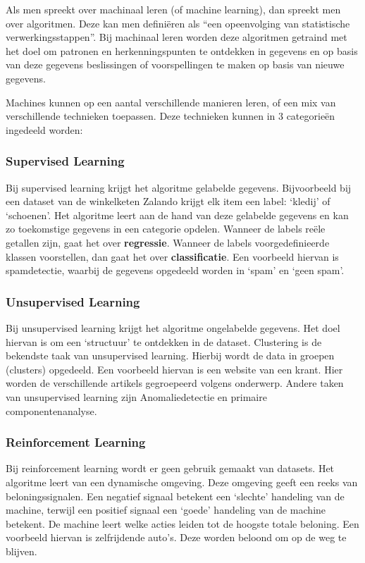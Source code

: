 Als men spreekt over machinaal leren (of machine learning), dan spreekt men over algoritmen. Deze kan men definiëren als “een opeenvolging van statistische verwerkingsstappen”. Bij machinaal leren worden deze algoritmen getraind met het doel om patronen en herkenningspunten te ontdekken in gegevens en op basis van deze gegevens beslissingen of voorspellingen te maken op basis van nieuwe gegevens. \autocite{IBM2020a}

Machines kunnen op een aantal verschillende manieren leren, of een mix van verschillende technieken toepassen. Deze technieken kunnen in 3 categorieën ingedeeld worden:

\subsubsection{Supervised Learning}
\label{sec:supervisedlearning}
Bij supervised learning krijgt het algoritme gelabelde gegevens. Bijvoorbeeld bij een dataset van de winkelketen Zalando krijgt elk item een label: ‘kledij’ of ‘schoenen’. Het algoritme leert aan de hand van deze gelabelde gegevens en kan zo toekomstige gegevens in een categorie opdelen. Wanneer de labels reële getallen zijn, gaat het over \textbf{regressie}. Wanneer de labels voorgedefinieerde klassen voorstellen, dan gaat het over \textbf{classificatie}. Een voorbeeld hiervan is spamdetectie, waarbij de gegevens opgedeeld worden in ‘spam’ en ‘geen spam’.\autocite{Lievens2020} 

\subsubsection{Unsupervised Learning}
\label{sec:unsupervisedlearning}
Bij unsupervised learning krijgt het algoritme ongelabelde gegevens. Het doel hiervan is om een ‘structuur’ te ontdekken in de dataset. Clustering is de bekendste taak van unsupervised learning. Hierbij wordt de data in groepen (clusters) opgedeeld. Een voorbeeld hiervan is een website van een krant. Hier worden de verschillende artikels gegroepeerd volgens onderwerp. \autocite{Lievens2020}
Andere taken van unsupervised learning zijn Anomaliedetectie en primaire componentenanalyse. 

\subsubsection{Reinforcement Learning}
\label{sec:reinforcementlearning}
Bij reinforcement learning wordt er geen gebruik gemaakt van datasets. Het algoritme leert van een dynamische omgeving. Deze omgeving geeft een reeks van beloningssignalen. Een negatief signaal betekent een ‘slechte’ handeling van de machine, terwijl een positief signaal een ‘goede’ handeling van de machine betekent. De machine leert welke acties leiden tot de hoogste totale beloning. \autocite{Lievens2020} Een voorbeeld hiervan is zelfrijdende auto’s. Deze worden beloond om op de weg te blijven. 
